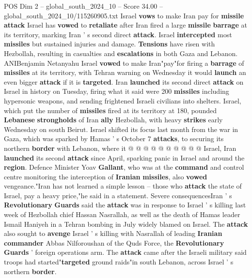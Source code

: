 \begin{textsample}{POS Dim 2 – global\_south\_2024\_10 – Score 34.00 – global\_south\_2024\_10/115260905.txt}  \label{ex:f2_pos_025}
Israel \textbf{vows} to make Iran pay for \textbf{missile} \textbf{attack} Israel has \textbf{vowed} to \textbf{retaliate} after Iran fired a large \textbf{missile} \textbf{barrage} at its territory, marking Iran ' s second direct \textbf{attack}.
Israel \textbf{intercepted} most \textbf{missiles} but sustained injuries and damage. \textbf{Tensions} have risen with Hezbollah, resulting in casualties and \textbf{escalations} in both Gaza and Lebanon.
ANIBenjamin Netanyahu Israel \textbf{vowed} to make Iran"pay"for firing a \textbf{barrage} of \textbf{missiles} at its territory, with Tehran warning on Wednesday it would \textbf{launch} an even bigger \textbf{attack} if it is \textbf{targeted}.
Iran \textbf{launched} its second direct \textbf{attack} on Israel in history on Tuesday, firing what it said were 200 \textbf{missiles} including hypersonic weapons, and sending frightened Israeli civilians into shelters.
Israel, which put the number of \textbf{missiles} fired at its territory at 180, pounded \textbf{Lebanese} \textbf{strongholds} of Iran \textbf{ally} Hezbollah, with heavy \textbf{strikes} early Wednesday on south Beirut.
Israel shifted its focus last month from the war in Gaza, which was sparked by Hamas ' s October 7 \textbf{attacks}, to securing its northern \textbf{border} with Lebanon, where it @ @ @ @ @ @ @ @ @ @ Israel, Iran \textbf{launched} its second \textbf{attack} since April, sparking panic in Israel and around the \textbf{region}.
Defence Minister Yoav \textbf{Gallant}, who was at the \textbf{command} and control centre monitoring the interception of \textbf{Iranian} \textbf{missiles}, also \textbf{vowed} vengeance."Iran has not learned a simple lesson -- those who \textbf{attack} the state of Israel, pay a heavy price,"he said in a statement.
Severe consequencesIran ' s \textbf{Revolutionary} \textbf{Guards} said the \textbf{attack} was in response to Israel ' s killing last week of Hezbollah chief Hassan Nasrallah, as well as the death of Hamas leader Ismail Haniyeh in a Tehran bombing in July widely blamed on Israel.
The \textbf{attack} also sought to \textbf{avenge} Israel ' s killing with Nasrallah of leading \textbf{Iranian} \textbf{commander} Abbas Nilforoushan of the Quds Force, the \textbf{Revolutionary} \textbf{Guards} ' foreign operations arm.
The \textbf{attack} came after the Israeli military said troops had started"\textbf{targeted} ground raids"in south Lebanon, across Israel ' s northern \textbf{border}.

\end{textsample}
